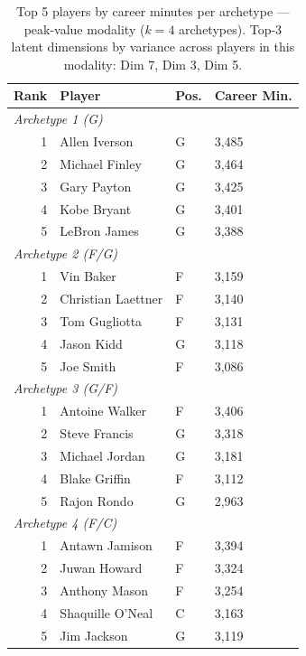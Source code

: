 \begin{table}[htbp]
  \centering\small
  \begin{tabular}{rlll}
    \toprule
    Rank & Player & Pos. & Career Min. \\
    \midrule
    \multicolumn{4}{l}{\textit{Archetype 1 (G)}} \\
    \midrule
    1 & Allen Iverson & G & 3,485 \\
    2 & Michael Finley & G & 3,464 \\
    3 & Gary Payton & G & 3,425 \\
    4 & Kobe Bryant & G & 3,401 \\
    5 & LeBron James & G & 3,388 \\
    \midrule[0.4pt]
    \multicolumn{4}{l}{\textit{Archetype 2 (F/G)}} \\
    \midrule
    1 & Vin Baker & F & 3,159 \\
    2 & Christian Laettner & F & 3,140 \\
    3 & Tom Gugliotta & F & 3,131 \\
    4 & Jason Kidd & G & 3,118 \\
    5 & Joe Smith & F & 3,086 \\
    \midrule[0.4pt]
    \multicolumn{4}{l}{\textit{Archetype 3 (G/F)}} \\
    \midrule
    1 & Antoine Walker & F & 3,406 \\
    2 & Steve Francis & G & 3,318 \\
    3 & Michael Jordan & G & 3,181 \\
    4 & Blake Griffin & F & 3,112 \\
    5 & Rajon Rondo & G & 2,963 \\
    \midrule[0.4pt]
    \multicolumn{4}{l}{\textit{Archetype 4 (F/C)}} \\
    \midrule
    1 & Antawn Jamison & F & 3,394 \\
    2 & Juwan Howard & F & 3,324 \\
    3 & Anthony Mason & F & 3,254 \\
    4 & Shaquille O'Neal & C & 3,163 \\
    5 & Jim Jackson & G & 3,119 \\
    \bottomrule
  \end{tabular}
  \caption{Top 5 players by career minutes per archetype --- peak-value modality ($k=4$ archetypes). Top-3 latent dimensions by variance across players in this modality: Dim 7, Dim 3, Dim 5.}
  \label{tab:arch_reps_peak_value}
\end{table}

